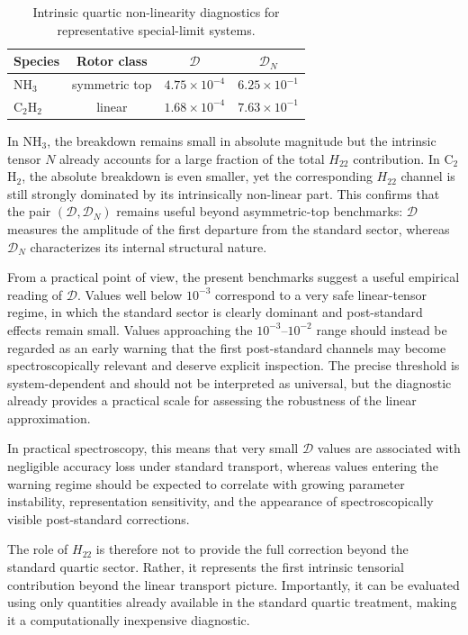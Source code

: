 \documentclass[aip,jcp,reprint,floatfix]{revtex4-2}
\begin{document}
\begin{table}[t]
\centering
\caption{Intrinsic quartic non-linearity diagnostics for representative
special-limit systems.}
\begin{tabular}{lccc}
\hline
Species & Rotor class & $\mathcal D$ & $\mathcal D_N$ \\
\hline
NH$_3$ & symmetric top & $4.75\times10^{-4}$ & $6.25\times10^{-1}$ \\
C$_2$H$_2$ & linear & $1.68\times10^{-4}$ & $7.63\times10^{-1}$ \\
\hline
\end{tabular}
\label{tab:h22_diagnostic_special}
\end{table}

In NH$_3$, the breakdown remains small in absolute magnitude but the
intrinsic tensor $N$ already accounts for a large fraction of the
total $H_{22}$ contribution. In C$_2$H$_2$, the absolute breakdown is
even smaller, yet the corresponding $H_{22}$ channel is still strongly
dominated by its intrinsically non-linear part. This confirms that the
pair $(\mathcal D,\mathcal D_N)$ remains useful beyond asymmetric-top
benchmarks: $\mathcal D$ measures the amplitude of the first departure
from the standard sector, whereas $\mathcal D_N$ characterizes its
internal structural nature.

From a practical point of view, the present benchmarks suggest a
useful empirical reading of $\mathcal D$. Values well below
$10^{-3}$ correspond to a very safe linear-tensor regime, in which the
standard sector is clearly dominant and post-standard effects remain
small. Values approaching the $10^{-3}$--$10^{-2}$ range should
instead be regarded as an early warning that the first post-standard
channels may become spectroscopically relevant and deserve explicit
inspection. The precise threshold is system-dependent and should not
be interpreted as universal, but the diagnostic already provides a
practical scale for assessing the robustness of the linear
approximation.

In practical spectroscopy, this means that very small $\mathcal D$
values are associated with negligible accuracy loss under standard
transport, whereas values entering the warning regime should be
expected to correlate with growing parameter instability,
representation sensitivity, and the appearance of spectroscopically
visible post-standard corrections.

The role of $H_{22}$ is therefore not to provide the full correction
beyond the standard quartic sector. Rather, it represents the first
intrinsic tensorial contribution beyond the linear transport picture.
Importantly, it can be evaluated using only quantities already
available in the standard quartic treatment, making it a
computationally inexpensive diagnostic.
\end{document}
